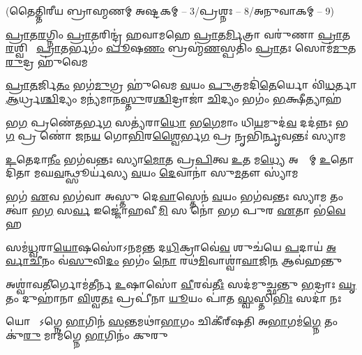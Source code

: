 

\vspace{-1ex}
\centerline{\normalsize(𑌤𑍈𑌤𑍍𑌤𑌿𑌰𑍀𑌯 𑌬𑍍𑌰𑌾𑌹𑍍𑌮𑌣𑌮𑍍 𑌅𑌷𑍍𑌟𑌕𑌮𑍍 – 3/𑌪𑍍𑌰𑌶𑍍𑌨𑌃 – 8/𑌅𑌨𑍁𑌵𑌾𑌕𑌮𑍍 – 9)}


\twolineshloka
{\ul{𑌪𑍍𑌰𑌾}𑌤\ul{𑌰}𑌗𑍍𑌨𑌿𑌂 \ul{𑌪𑍍𑌰𑌾}𑌤𑌰𑌿𑌨𑍍𑌦𑍍𑌰॑ 𑌹𑌵𑌾𑌮𑌹𑍇 \ul{𑌪𑍍𑌰𑌾}𑌤\ul{𑌰𑍍𑌮𑌿}𑌤𑍍𑌰𑌾 𑌵𑌰𑍁॑𑌣𑌾 \ul{𑌪𑍍𑌰𑌾}𑌤\ul{𑌰}𑌶𑍍𑌵𑌿𑌨𑌾᳚}
{\ul{𑌪𑍍𑌰𑌾}𑌤𑌰𑍍𑌭𑌗𑌂॑ \ul{𑌪𑍂}𑌷\ul{𑌣𑌂} 𑌬𑍍𑌰𑌹𑍍𑌮॑\ul{𑌣}𑌸𑍍𑌪𑌤𑌿𑌂॑ \ul{𑌪𑍍𑌰𑌾}𑌤𑌃 𑌸𑍋𑌮॑\ul{𑌮𑍁}𑌤 \ul{𑌰𑍁}𑌦𑍍𑌰 𑌹𑍁॑𑌵𑍇𑌮}

\twolineshloka
{\ul{𑌪𑍍𑌰𑌾}\ul{𑌤}𑌰𑍍𑌜𑌿\ul{𑌤𑌂} 𑌭𑌗॑\ul{𑌮𑍁}𑌗𑍍𑌰 𑌹𑍁॑𑌵𑍇𑌮 \ul{𑌵}𑌯𑌂 \ul{𑌪𑍁}𑌤𑍍𑌰𑌮𑌦𑌿॑\ul{𑌤𑍇}𑌰𑍍𑌯𑍋 𑌵𑌿॑\ul{𑌧}𑌰𑍍𑌤𑌾}
{\ul{𑌆}𑌰𑍍𑌧𑍍𑌰\ul{𑌶𑍍𑌚𑌿}𑌦𑍍𑌯𑌂 𑌮𑌨𑍍𑌯॑𑌮𑌾𑌨\ul{𑌸𑍍𑌤𑍁}𑌰\ul{𑌶𑍍𑌚𑌿}𑌦𑍍𑌰𑌾𑌜𑌾॑ \ul{𑌚𑌿}𑌦𑍍𑌯𑌂 𑌭𑌗𑌂॑ \ul{𑌭}𑌕𑍍𑌷𑍀𑌤𑍍𑌯𑌾𑌹॑}

\twolineshloka
{𑌭\ul{𑌗} 𑌪𑍍𑌰𑌣𑍇॑\ul{𑌤}𑌰𑍍𑌭\ul{𑌗} 𑌸𑌤𑍍𑌯॑𑌰𑌾\ul{𑌧𑍋} 𑌭\ul{𑌗𑍇}𑌮𑌾𑌂 𑌧𑌿\ul{𑌯}𑌮𑍁𑌦॑\ul{𑌵} 𑌦𑌦॑𑌨𑍍𑌨𑌃}
{𑌭\ul{𑌗} 𑌪𑍍𑌰 𑌣𑍋॑ 𑌜𑌨\ul{𑌯} 𑌗𑍋\ul{𑌭𑌿}𑌰\ul{𑌶𑍍𑌵𑍈}𑌰𑍍𑌭\ul{𑌗} 𑌪𑍍𑌰 𑌨𑍃𑌭𑌿॑\ul{𑌰𑍍𑌨𑍃}𑌵𑌨𑍍𑌤𑌃॑ 𑌸𑍍𑌯𑌾𑌮}

\twolineshloka
{\ul{𑌉}𑌤𑍇𑌦𑌾\ul{𑌨𑍀𑌂} 𑌭𑌗॑𑌵𑌨𑍍𑌤𑌃 𑌸𑍍𑌯𑌾\ul{𑌮𑍋}𑌤 𑌪𑍍𑌰\ul{𑌪𑌿}𑌤𑍍𑌵 \ul{𑌉}𑌤 𑌮\ul{𑌧𑍍𑌯𑍇} 𑌅𑌹𑍍𑌨𑌾᳚𑌮𑍍}
{\ul{𑌉}𑌤𑍋𑌦𑌿॑𑌤𑌾 𑌮𑌘\ul{𑌵}𑌨𑍍𑌥𑍍𑌸𑍂𑌰𑍍𑌯॑𑌸𑍍𑌯 \ul{𑌵}𑌯𑌂 \ul{𑌦𑍇}𑌵𑌾𑌨𑌾॑ 𑌸𑍁\ul{𑌮}𑌤𑍗 𑌸𑍍𑌯𑌾॑𑌮}

\twolineshloka
{𑌭𑌗॑ \ul{𑌏}𑌵 𑌭𑌗॑𑌵𑌾 𑌅𑌸𑍍𑌤𑍁 𑌦𑍇\ul{𑌵𑌾}𑌸𑍍𑌤𑍇𑌨॑ \ul{𑌵}𑌯𑌂 𑌭𑌗॑𑌵𑌨𑍍𑌤𑌃 𑌸𑍍𑌯𑌾𑌮}
{𑌤𑌂 𑌤𑍍𑌵𑌾॑ 𑌭\ul{𑌗} 𑌸\ul{𑌰𑍍𑌵} 𑌇𑌜𑍍𑌜𑍋॑𑌹𑌵𑍀\ul{𑌮𑌿} 𑌸 𑌨𑍋॑ 𑌭𑌗 𑌪𑍁𑌰 \ul{𑌏}𑌤𑌾 𑌭॑\ul{𑌵𑍇}𑌹}

\twolineshloka
{𑌸𑌮॑\ul{𑌧𑍍𑌵}𑌰𑌾\ul{𑌯𑍋}𑌷𑌸𑍋॑𑌽𑌨𑌮𑌨𑍍𑌤 𑌦\ul{𑌧𑌿}𑌕𑍍𑌰𑌾𑌵𑍇॑\ul{𑌵} 𑌶𑍁𑌚॑𑌯𑍇 \ul{𑌪}𑌦𑌾𑌯॑}
{\ul{𑌅}\ul{𑌰𑍍𑌵𑌾}\ul{𑌚𑍀}𑌨𑌂 𑌵॑\ul{𑌸𑍁}𑌵𑌿\ul{𑌦𑌂} 𑌭𑌗𑌂॑ \ul{𑌨𑍋} 𑌰𑌥॑\ul{𑌮𑌿}𑌵𑌾𑌶𑍍𑌵𑌾॑\ul{𑌵𑌾}𑌜𑌿\ul{𑌨} 𑌆𑌵॑𑌹𑌨𑍍𑌤𑍁}

\twolineshloka
{𑌅𑌶𑍍𑌵𑌾॑𑌵\ul{𑌤𑍀}𑌰𑍍𑌗𑍋𑌮॑𑌤𑍀𑌰𑍍𑌨 \ul{𑌉}𑌷𑌾𑌸𑍋॑ \ul{𑌵𑍀}𑌰𑌵॑\ul{𑌤𑍀𑌃} 𑌸𑌦॑𑌮𑍁𑌚𑍍𑌛𑌨𑍍𑌤𑍁 \ul{𑌭}𑌦𑍍𑌰𑌾𑌃}
{\ul{𑌘𑍃}𑌤𑌂 𑌦𑍁𑌹𑌾॑𑌨𑌾 \ul{𑌵𑌿}𑌶𑍍𑌵\ul{𑌤𑌃} 𑌪𑍍𑌰𑌪𑍀॑𑌨𑌾 \ul{𑌯𑍂}𑌯𑌂 𑌪𑌾॑𑌤 \ul{𑌸𑍍𑌵}𑌸𑍍𑌤𑌿\ul{𑌭𑌿𑌃} 𑌸𑌦𑌾॑ 𑌨𑌃}

\twolineshloka
{𑌯𑍋 𑌮𑌾᳚𑌽𑌗𑍍𑌨𑍇 \ul{𑌭𑌾}𑌗𑌿𑌨॑ \ul{𑌸}𑌨𑍍𑌤𑌮𑌥𑌾॑\ul{𑌭𑌾}𑌗𑌂 𑌚𑌿𑌕𑍀॑𑌰𑍍‌𑌷𑌤𑌿}
{𑌅\ul{𑌭𑌾}𑌗𑌮॑\ul{𑌗𑍍𑌨𑍇} 𑌤𑌂 𑌕𑍁॑\ul{𑌰𑍁} 𑌮𑌾𑌮॑𑌗𑍍𑌨𑍇 \ul{𑌭𑌾}𑌗𑌿𑌨𑌂॑ 𑌕𑍁𑌰𑍁}

